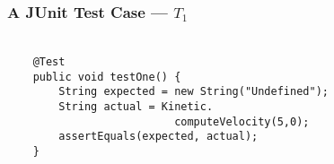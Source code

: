 
\begin{frame}[fragile]
  \frametitle{\vspace*{.5in}A JUnit Test Case --- $T_1$}
  \framesubtitle{}

  \normalsize
  \hspace*{-.65in}
  \begin{minipage}{5in}
    \Large
    \vspace*{-.1in}
    \begin{verbatim}

    @Test
    public void testOne() {
        String expected = new String("Undefined");
        String actual = Kinetic.
                          computeVelocity(5,0);
        assertEquals(expected, actual);
    }

    \end{verbatim}
  \vspace*{.05in}
  \end{minipage}
  \normalsize
  \HUGE



\end{frame}
